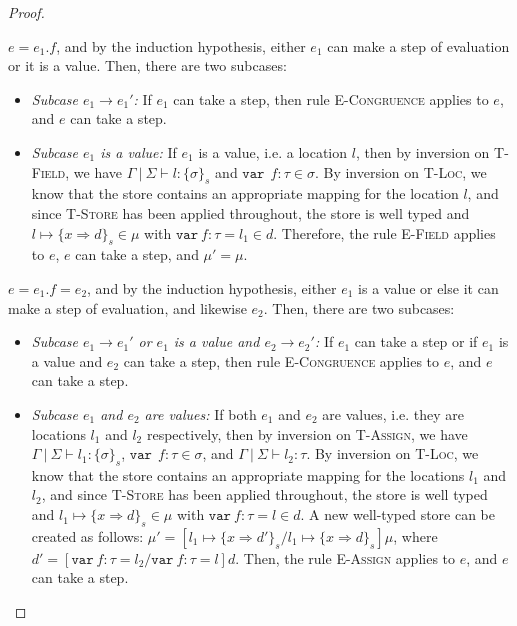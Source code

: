 \documentclass{llncs}
\newcommand{\keywadj}[1]{\mathtt{#1}}
\newcommand{\keyw}[1]{\keywadj{#1}~}
\newcommand{\pcase}[1][]{
  \if\relax\detokenize{#1}\relax
    \def\thiscase{}
  \else
    \def\thiscase{~#1}
  \fi
  \item
}
\begin{document}
\begin{proof}
\begin{pcases}
\pcase[\textsc{T-Field}]
$e = e_1.f$, and by the induction hypothesis, either $e_1$ can make a step of evaluation or it is a value. Then, there are two subcases:
\\
\begin{itemize}
\item[]  \textit{Subcase $e_1 \longrightarrow e_1'$:} If $e_1$ can take a step, then rule \textsc{E-Congruence} applies to $e$, and $e$ can take a step.
\\
\item[]  \textit{Subcase $e_1$ is a value:} If $e_1$ is a value, i.e. a location $l$, then by inversion on \textsc{T-Field}, we have $\Gamma~|~\Sigma \vdash l : \{\sigma\}_s$ and $\keyw{var}~ f : \tau \in \sigma
$. By inversion on \textsc{T-Loc}, we know that the store contains an appropriate mapping for the location $l$, and since \textsc{T-Store} has been applied throughout, the store is well typed and $l \mapsto \{ x \Rightarrow d \}_{s} \in \mu$ with $\keyw{var} f : \tau = l_1 \in d$. Therefore, the rule \textsc{E-Field} applies to $e$, $e$ can take a step, and $\mu' = \mu$.
\\
\end{itemize}

\pcase[\textsc{T-Assign}]
$e = e_1.f=e_2$, and by the induction hypothesis, either $e_1$ is a value or else it can make a step of evaluation, and likewise $e_2$. Then, there are two subcases:
\\
\begin{itemize}
\item[]  \textit{Subcase $e_1 \longrightarrow e_1'$ or $e_1$ is a value and $e_2 \longrightarrow e_2'$:} If $e_1$ can take a step or if $e_1$ is a value and $e_2$ can take a step, then rule \textsc{E-Congruence} applies to $e$, and $e$ can take a step.
\\
\item[]  \textit{Subcase $e_1$ and $e_2$ are values:} If both $e_1$ and $e_2$ are values, i.e. they are locations $l_1$ and $l_2$ respectively, then by inversion on \textsc{T-Assign}, we have $\Gamma~|~\Sigma \vdash l_1 : \{\sigma\}_s$, $\keyw{var}~ f:\tau \in \sigma$, and $\Gamma~|~\Sigma \vdash l_2 : \tau$. By inversion on \textsc{T-Loc}, we know that the store contains an appropriate mapping for the locations $l_1$ and $l_2$, and 
since \textsc{T-Store} has been applied throughout, the store is well typed and $l_1 \mapsto \{ x \Rightarrow d \}_{s} \in \mu$ with $\keyw{var} f:\tau = l \in d$. A new well-typed store can be created as follows: $\mu' = [l_1 \mapsto \{ x \Rightarrow d' \}_{s}/l_1 \mapsto \{ x \Rightarrow d \}_{s}]\mu$, where $d' = [\keyw{var} f:\tau = l_2/\keyw{var} f:\tau = l]d$. Then, the rule \textsc{E-Assign} applies to $e$, and $e$ can take a step.
\\
\end{itemize}


\end{pcases}
\end{proof}
\end{document}
